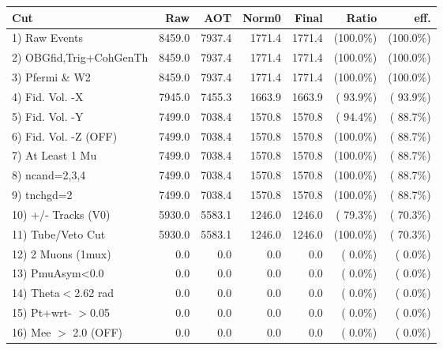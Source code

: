  \begin{table}[h!]\centering
 \begin{tabular}{||l||r|r|r|r|r|r||}
 \hline
 \hline
 Cut & Raw & AOT & Norm0 & Final & Ratio & eff.       \\
 \hline
  1) Raw Events           &       8459.0 &       7937.4 &       1771.4 &       1771.4 & (100.0\%) & (100.0\%) \\
  2) OBGfid,Trig+CohGenTh &       8459.0 &       7937.4 &       1771.4 &       1771.4 & (100.0\%) & (100.0\%) \\
  3) Pfermi \& W2         &       8459.0 &       7937.4 &       1771.4 &       1771.4 & (100.0\%) & (100.0\%) \\
  4) Fid. Vol. -X         &       7945.0 &       7455.3 &       1663.9 &       1663.9 & ( 93.9\%) & ( 93.9\%) \\
  5) Fid. Vol. -Y         &       7499.0 &       7038.4 &       1570.8 &       1570.8 & ( 94.4\%) & ( 88.7\%) \\
  6) Fid. Vol. -Z (OFF)   &       7499.0 &       7038.4 &       1570.8 &       1570.8 & (100.0\%) & ( 88.7\%) \\
  7) At Least 1 Mu        &       7499.0 &       7038.4 &       1570.8 &       1570.8 & (100.0\%) & ( 88.7\%) \\
  8) ncand=2,3,4          &       7499.0 &       7038.4 &       1570.8 &       1570.8 & (100.0\%) & ( 88.7\%) \\
  9) tnchgd=2             &       7499.0 &       7038.4 &       1570.8 &       1570.8 & (100.0\%) & ( 88.7\%) \\
 10) +/- Tracks (V0)      &       5930.0 &       5583.1 &       1246.0 &       1246.0 & ( 79.3\%) & ( 70.3\%) \\
 11) Tube/Veto Cut        &       5930.0 &       5583.1 &       1246.0 &       1246.0 & (100.0\%) & ( 70.3\%) \\
 12) 2 Muons (1mux)       &          0.0 &          0.0 &          0.0 &          0.0 & (  0.0\%) & (  0.0\%) \\
 13) PmuAsym<0.0          &          0.0 &          0.0 &          0.0 &          0.0 & (  0.0\%) & (  0.0\%) \\
 14) Theta$<$2.62 rad     &          0.0 &          0.0 &          0.0 &          0.0 & (  0.0\%) & (  0.0\%) \\
 15) Pt+wrt- $>$0.05      &          0.0 &          0.0 &          0.0 &          0.0 & (  0.0\%) & (  0.0\%) \\
 16) Mee $>$ 2.0  (OFF)   &          0.0 &          0.0 &          0.0 &          0.0 & (  0.0\%) & (  0.0\%) \\

\end{tabular}
\end{table}
